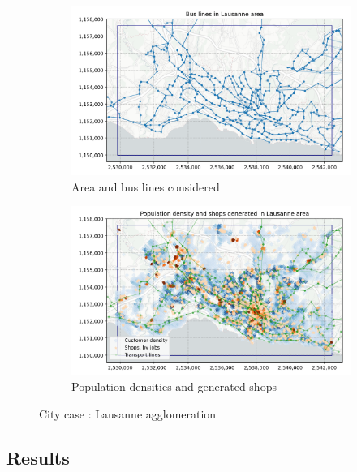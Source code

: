 \begin{figure}
    \centering
    \begin{subfigure}{0.49\linewidth}
       \includegraphics[width=\linewidth]{../fig/laus_bus.png}
       \caption{Area and bus lines considered}
       \label{fig:agglo_area}
    \end{subfigure}
    \begin{subfigure}{0.49\linewidth}
       \includegraphics[width=\linewidth]{../fig/laus_density.png}
       \caption{Population densities and generated shops}
       \label{fig:agglo_densities}
    \end{subfigure}
    \caption{City case : Lausanne agglomeration}
    \label{fig:agglo_case}
\end{figure}


\subsection{Results}

